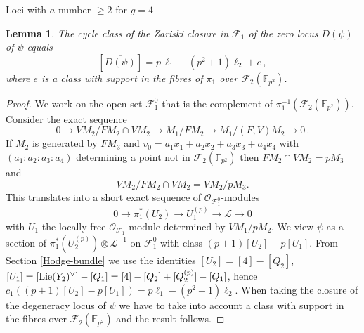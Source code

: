 \documentclass[11pt]{amsart}
\numberwithin{equation}{section}
\newcommand{\FF}{\mathbb F}
\newtheorem{lemma}[theorem]{Lemma}
\theoremstyle{definition}
\theoremstyle{remark}
\begin{document}
\begin{section}{Loci with $a$-number $\geq 2$ for $g=4$}
\begin{lemma}\label{Dpsi-class}
The cycle class of the Zariski closure in $\mathcal{F}_1$ 
of the zero locus $D(\psi)$ of $\psi$
equals
$$
[\overline{D(\psi)}]=p\, \ell_1-(p^2+1)\ell_2+e\, ,
$$ 
where $e$ is a class with support
in the fibres of $\pi_1$ over $\mathcal{F}_2({\FF}_{p^2})$.
\end{lemma}
\begin{proof} We work on the open set $\mathcal{F}_1^0$ that is the complement of 
$\pi_1^{-1}(\mathcal{F}_2({\FF}_{p^2}))$.
Consider the exact sequence
$$
0 \to VM_2/FM_2\cap VM_2 \to M_1/FM_2 \to M_1/(F,V)M_2 \to 0\, .
$$
If $M_2$ is generated by $FM_3$ and $v_0=a_1x_1+a_2x_2+a_3x_3+ a_4x_4$ with $(a_1:a_2:a_3:a_4)$
determining a point 
not in $\mathcal{F}_2({\FF}_{p^2})$ then $FM_2 \cap VM_2=pM_3$ and
$$
VM_2/FM_2\cap VM_2 =VM_2/pM_3. 
$$
This translates into a short exact sequence of $\mathcal{O}_{\mathcal{F}_1^0}$-modules
$$
0 \to \pi_1^*(U_2) \to U_1^{(p)} \to \mathcal{L} \to 0 
$$
with $U_1$ the locally free $\mathcal{O}_{\mathcal{F}_{1}}$-module
determined by $VM_1/pM_2$.
We view $\psi$ as a section of
$\pi_1^*(U_2^{(p)})\otimes \mathcal{L}^{-1}$ on $\mathcal{F}_1^0$ with class
$(p+1)[U_2]-p[U_1]$. 
From Section \ref{Hodge-bundle} we use the identities
$[U_2]=[4]-[Q_2]$,
$[U_1]=[{\rm Lie}(Y_2)^{\vee}]-[Q_1]=[4]-[Q_2]+[Q_2^{(p)}]-[Q_1]$,
hence $c_1((p+1)[U_2]-p[U_1])=p\ell_1-(p^2+1)\ell_2$.
When taking the closure of the
degeneracy locus of $\psi$ we have to take into account a class with
support in the fibres over $\mathcal{F}_2({\FF}_{p^2})$ and the result follows.
\end{proof}


\end{section}
\end{document}
